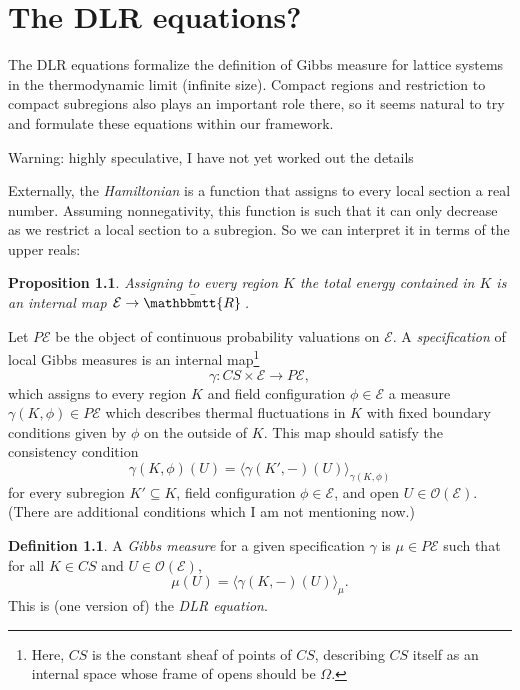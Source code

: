 \documentclass[11pt, oneside, article]{memoir}
\theoremstyle{plain}
\newtheorem{proposition}[theorem]{Proposition}
\theoremstyle{definition}
\newtheorem{definition}[theorem]{Definition}
\theoremstyle{remark}
\newcommand{\Open}[1]{\mathcal{O}(#1)}
\newcommand{\internal}[1]{\raisebox{-.03ex}{$\mathbbmtt{#1}$}}
\newcommand{\hs}{\hspace{1.1pt}}
\newcommand{\tRR}{\internal{R}\hs}
\newcommand{\tUR}{\bar{\tRR}\hs}
\begin{document}
\chapter{The DLR equations?}


The DLR equations formalize the definition of Gibbs measure for lattice systems in the thermodynamic limit (infinite size). Compact regions and restriction to compact subregions also plays an important role there, so it seems natural to try and formulate these equations within our framework.

Warning: highly speculative, I have not yet worked out the details

Externally, the \emph{Hamiltonian} is a function that assigns to every local section a real number. Assuming nonnegativity, this function is such that it can only decrease as we restrict a local section to a subregion. So we can interpret it in terms of the upper reals:

\begin{proposition}
Assigning to every region $K$ the \emph{total energy} contained in $K$ is an internal map $\mathcal{E} \to \tUR$.
\end{proposition}

Let $P\mathcal{E}$ be the object of continuous probability valuations on $\mathcal{E}$. A \emph{specification} of local Gibbs measures is an internal map\footnote{Here, $CS$ is the constant sheaf of points of $CS$, describing $CS$ itself as an internal space whose frame of opens should be $\Omega$.}
\[
	\gamma : CS \times \mathcal{E} \to P\mathcal{E},
\]
which assigns to every region $K$ and field configuration $\phi\in\mathcal{E}$ a measure $\gamma(K,\phi)\in P\mathcal{E}$ which describes thermal fluctuations in $K$ with fixed boundary conditions given by $\phi$ on the outside of $K$. This map should satisfy the consistency condition
\[
	\gamma(K,\phi)(U) = \langle \gamma(K',-) (U) \rangle_{\gamma(K,\phi)}
\]
for every subregion $K'\subseteq K$, field configuration $\phi\in\mathcal{E}$, and open $U\in\Open{\mathcal{E}}$. (There are additional conditions which I am not mentioning now.)

\begin{definition}
A \emph{Gibbs measure} for a given specification $\gamma$ is $\mu\in P\mathcal{E}$ such that for all $K\in CS$ and $U \in \Open{\mathcal{E}}$,
\[
	\mu(U) = \langle \gamma(K,-)(U) \rangle_\mu.
\]
This is (one version of) the \emph{DLR equation}.
\end{definition}
\end{document}
